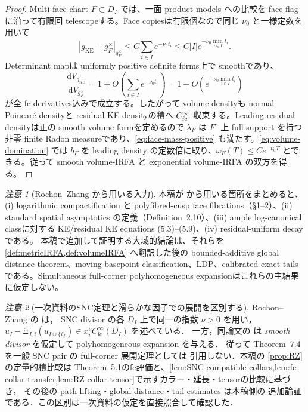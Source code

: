 \documentclass[11pt,a4paper]{ltjsarticle}
\newcommand{\dd}{\mathrm d}
\theoremstyle{plain}
\theoremstyle{definition}
\theoremstyle{remark}
\newtheorem{remark}[remark]{注意}
\begin{document}
\begin{proof}
Multi-face chart $F\subset D_I$ では、一面 product models への比較を face flag に沿って有限回 telescopeする。Face copiesは有限個なので同じ $\nu_0$ と一様定数を用いて
\[
 |g_{\mathrm{KE}}-g_F^\times|_{g_F^\times}
 \le C\sum_{i\in I}e^{-\nu_0t_i}
 \le C|I|e^{-\nu_0\min_{i\in I}t_i}.
\]
Determinant mapは uniformly positive definite forms上で smoothであり、
\[
 \frac{\dd V_{g_{\mathrm{KE}}}}{\dd V_{g_F^\times}}
 =1+O\!\left(\sum_{i\in I}e^{-\nu_0t_i}\right)
 =1+O\!\left(e^{-\nu_0\min_{i\in I}t_i}\right)
\]
が全 fc derivatives込みで成立する。したがって volume densityも normal Poincar\'e densityと residual KE densityの積へ $C^\infty_{\rm fc}$ 収束する。Leading residual densityは正の smooth volume formを定めるので $\lambda_F$ は $F^\circ$ 上 full support を持つ非零 finite Radon measureであり、\eqref{eq:face-mass-positive} も満たす。\eqref{eq:volume-domination} では $b_F$ を leading density の定数倍に取り、$\omega_F(T)\le Ce^{-\nu_0T}$ とできる。従って smooth volume-IRFA と exponential volume-IRFA の双方を得る。
\end{proof}

\begin{remark}[Rochon--Zhang から用いる入力]
\label{rem:RZ-input}
本稿が \cite{RochonZhang} から用いる箇所をまとめると、(i) logarithmic compactification と polyfibred-cusp face fibrations（§1--2）、(ii) standard spatial asymptotics の定義（Definition~2.10）、(iii) ample log-canonical classに対する KE/residual KE equations (5.3)--(5.9)、(iv) residual-uniform decay \cite[Theorem~5.1]{RochonZhang} である。
本稿で追加して証明する大域的結論は、それらを \cref{def:metricIRFA,def:volumeIRFA} へ翻訳した後の bounded-additive global distance theorem、moving-basepoint classification、LDP、calibrated exact tailsである。Simultaneous full-corner polyhomogeneous expansionはこれらの主結果に仮定しない。
\end{remark}

\begin{remark}[一次資料のSNC定理と滑らかな因子での展開を区別する]
\label{rem:RZ-primary-scope}
Rochon--Zhang の \cite[Theorem~5.1, §5]{RochonZhang} は，
SNC divisor の各 $D_I$ 上で同一の指数 $\nu>0$ を用い，
$u_I-\Xi_{I,i}(u_{I\cup\{i\}})\in
x_i^\nu C^\infty_{\mathrm{fc}}(D_I)$ を述べている．
一方，同論文の \cite[Theorem~7.4]{RochonZhang} は
\emph{smooth divisor} を仮定して polyhomogeneous expansion を与える．
従って Theorem~7.4 を一般 SNC pair の full-corner 展開定理としては
引用しない．本稿の \cref{prop:RZ} の定量的積比較は
Theorem~5.1のfc評価と、\cref{lem:SNC-compatible-collars,lem:fc-collar-transfer,lem:RZ-collar-tensor}で示すカラー・延長・tensorの比較に基づき，
その後の path-lifting・global distance・tail estimates は本稿側の
追加論証である．この区別は一次資料の仮定を直接照合して確認した．
\end{remark}
\end{document}
